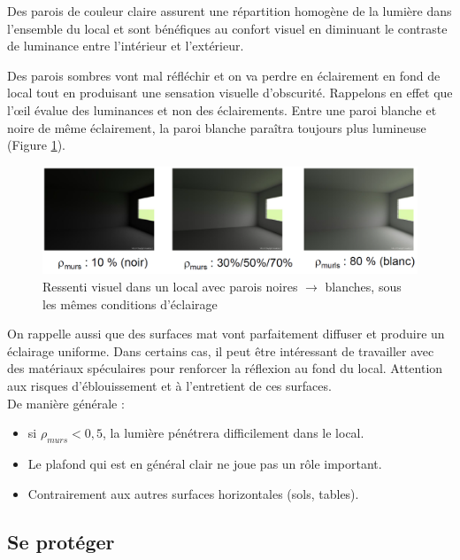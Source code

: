 \documentclass[11pt]{report}
\begin{document}
Des parois de couleur claire assurent une répartition homogène de la lumière dans l'ensemble du local et sont bénéfiques au confort visuel en diminuant le contraste de luminance entre l'intérieur et l'extérieur.

Des parois sombres vont mal réfléchir et on va perdre en éclairement en fond de local tout en produisant une sensation visuelle d'obscurité. Rappelons en effet que l'œil évalue des luminances et non des éclairements. Entre une paroi blanche et noire de même éclairement, la paroi blanche paraîtra toujours plus lumineuse (Figure \ref{rh}). \\


\begin{figure}[h]
\centering
\includegraphics[width=\linewidth]{rho}
\caption{Ressenti visuel dans un local avec parois noires $\rightarrow$ blanches, sous les mêmes conditions d'éclairage}
\label{rh}
\end{figure}



On rappelle aussi que des surfaces mat vont parfaitement diffuser et produire un éclairage uniforme. Dans certains cas, il peut être intéressant de travailler avec des matériaux spéculaires pour renforcer la réflexion au fond du local. Attention aux risques d'éblouissement et à l'entretient de ces surfaces.\\

De manière générale : 
\begin{itemize}
\item si $\rho_{murs}<0,5$, la lumière pénétrera difficilement dans le local.
\item Le plafond qui est en général clair ne joue pas un rôle important.
\item Contrairement aux autres surfaces horizontales (sols, tables).
\end{itemize}





\subsection{Se protéger}
\label{protec}
\\
\end{document}
